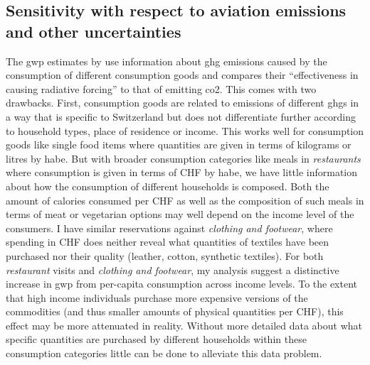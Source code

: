 \documentclass[a4paper,11pt,abstract=true]{scrartcl}
\begin{document}

\clearpage

\subsection{Sensitivity with respect to aviation emissions and other uncertainties}
\label{sec:aviation}


The \ac{gwp} estimates by \citet{jakobs_nfp73_2023} use information about \ac{ghg} emissions caused by the consumption of different consumption goods and compares their ``effectiveness in causing radiative forcing'' to that of emitting \ac{co2}.
This comes with two drawbacks.
First, consumption goods are related to emissions of different \acp{ghg} in a way that is specific to Switzerland but does not differentiate further according to household types, place of residence or income.
This works well for consumption goods like single food items where quantities are given in terms of kilograms or litres by \ac{habe}.
But with broader consumption categories like meals in \emph{restaurants} where consumption is given in terms of CHF by \ac{habe}, we have little information about how the consumption of different households is composed.
Both the amount of calories consumed per CHF as well as the composition of such meals in terms of meat or vegetarian options may well depend on the income level of the consumers.
I have similar reservations against \emph{clothing and footwear}, where spending in CHF does neither reveal what quantities of textiles have been purchased nor their quality (leather, cotton, synthetic textiles).
For both \emph{restaurant} visits and \emph{clothing and footwear}, my analysis suggest a distinctive increase in \ac{gwp} from per-capita consumption across income levels.
To the extent that high income individuals purchase more expensive versions of the commodities (and thus smaller amounts of physical quantities per CHF), this effect may be more attenuated in reality.
Without more detailed data about what specific quantities are purchased by different households within these consumption categories little can be done to alleviate this data problem.
\end{document}
